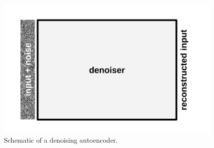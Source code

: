 \begin{figure}
  \includegraphics[width=\linewidth]{img/denoiser}
  \caption{
    Schematic of a denoising autoencoder.
  }\label{fig:denoiser}
\end{figure}
